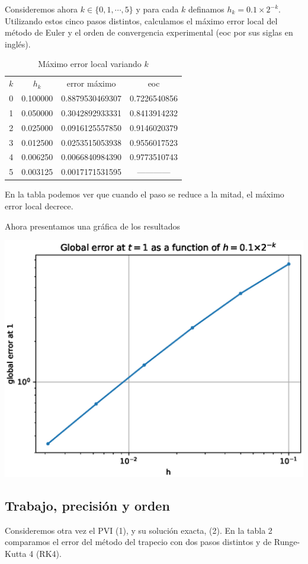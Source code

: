\documentclass[spanish]{article}
\begin{document}
Consideremos ahora $k \in \{0, 1, \cdots, 5\}$ y para cada $k$ definamos $h_k =
0.1 \times 2^{-k}$.  Utilizando estos cinco pasos distintos, calculamos el máximo
error local del método de Euler y el orden de convergencia experimental (eoc por sus 
siglas en inglés).

\begin{table}[h]
\caption{Máximo error local variando $k$}
\centering
\begin{tabular}{cccc}
\hline \hline
$k$ & $h_k$ & error máximo & eoc \\ [0.5ex]
0 & 0.100000 &  0.8879530469307 & 0.7226540856 \\
1 & 0.050000 & 0.3042892933331 & 0.8413914232 \\
2 & 0.025000 & 0.0916125557850 & 0.9146020379 \\
3 & 0.012500 & 0.0253515053938 & 0.9556017523 \\
4 & 0.006250 & 0.0066840984390 & 0.9773510743 \\
5 & 0.003125 & 0.0017171531595 & ------------ \\
\hline
\end{tabular}
\label{tab:hresult}
\end{table}
En la tabla podemos ver que cuando el paso se reduce a la mitad, el máximo
error local decrece.

Ahora presentamos una gráfica de los resultados


\includegraphics{plot31.eps}


\noindent
\subsection{Trabajo, precisión y orden}
Consideremos otra vez el PVI (1), y su solución exacta, (2). En la tabla 2 comparamos
el error del método del trapecio con dos pasos distintos y de Runge-Kutta 4 (RK4). 
\end{document}
